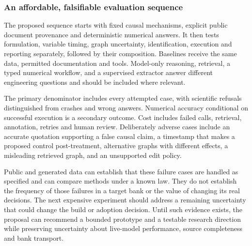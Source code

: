 \hypertarget{an-affordable-falsifiable-evaluation-sequence}{%
\subsubsection{An affordable, falsifiable evaluation
sequence}\label{an-affordable-falsifiable-evaluation-sequence}}

The proposed sequence starts with fixed causal mechanisms, explicit
public document provenance and deterministic numerical answers. It then
tests formulation, variable timing, graph uncertainty, identification,
execution and reporting separately, followed by their composition.
Baselines receive the same data, permitted documentation and tools.
Model-only reasoning, retrieval, a typed numerical workflow, and a
supervised extractor answer different engineering questions and should
be included where relevant.

The primary denominator includes every attempted case, with scientific
refusals distinguished from crashes and wrong answers. Numerical
accuracy conditional on successful execution is a secondary outcome.
Cost includes failed calls, retrieval, annotation, retries and human
review. Deliberately adverse cases include an accurate quotation
supporting a false causal claim, a timestamp that makes a proposed
control post-treatment, alternative graphs with different effects, a
misleading retrieved graph, and an unsupported edit policy.

Public and generated data can establish that these failure cases are
handled as specified and can compare methods under a known law. They do
not establish the frequency of those failures in a target bank or the
value of changing its real decisions. The next expensive experiment
should address a remaining uncertainty that could change the build or
adoption decision. Until such evidence exists, the proposal can
recommend a bounded prototype and a testable research direction while
preserving uncertainty about live-model performance, source completeness
and bank transport.

\label{exec13:census-evaluation-end}
